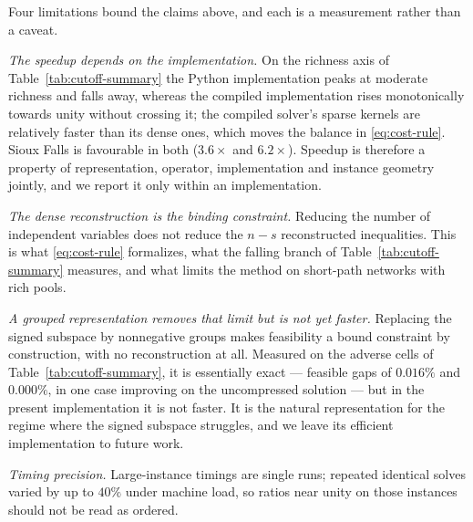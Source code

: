 \documentclass[11pt]{article}
\begin{document}
Four limitations bound the claims above, and each is a measurement rather than a caveat.

\emph{The speedup depends on the implementation.} On the richness axis of
Table~\ref{tab:cutoff-summary} the Python implementation peaks at moderate richness and falls
away, whereas the compiled implementation rises monotonically towards unity without crossing
it; the compiled solver's sparse kernels are relatively faster than its dense ones, which
moves the balance in \eqref{eq:cost-rule}. Sioux Falls is favourable in both ($3.6\times$ and
$6.2\times$). Speedup is therefore a property of representation, operator, implementation and
instance geometry jointly, and we report it only within an implementation.

\emph{The dense reconstruction is the binding constraint.} Reducing the number of independent
variables does not reduce the $n-s$ reconstructed inequalities. This is what
\eqref{eq:cost-rule} formalizes, what the falling branch of Table~\ref{tab:cutoff-summary}
measures, and what limits the method on short-path networks with rich pools.

\emph{A grouped representation removes that limit but is not yet faster.} Replacing the
signed subspace by nonnegative groups makes feasibility a bound constraint by construction,
with no reconstruction at all. Measured on the adverse cells of
Table~\ref{tab:cutoff-summary}, it is essentially exact --- feasible gaps of $0.016\%$ and
$0.000\%$, in one case improving on the uncompressed solution --- but in the present
implementation it is not faster. It is the natural representation for the regime where the
signed subspace struggles, and we leave its efficient implementation to future work.

\emph{Timing precision.} Large-instance timings are single runs; repeated identical solves
varied by up to $40\%$ under machine load, so ratios near unity on those instances should not
be read as ordered.
\end{document}
